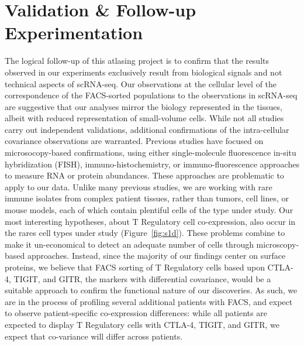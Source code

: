 \section{Validation \& Follow-up Experimentation}
The logical follow-up of this atlasing project is to confirm that the results observed in our experiments exclusively result from biological signals and not technical aspects of scRNA-seq. 
Our observations at the cellular level of the correspondence of the FACS-sorted populations to the observations in scRNA-seq are suggestive that our analyses mirror the biology represented in the tissues, albeit with reduced representation of small-volume cells. 
While not all studies carry out independent validations, additional confirmations of the intra-cellular covariance observations are warranted. %
Previous studies \citep{Shalek2013,Shalek2014} have focused on microsocopy-based confirmations, using either single-molecule fluorescence in-situ hybridization (FISH), immuno-histochemistry, or immuno-fluorescence approaches to measure RNA or protein abundances. 
These approaches are problematic to apply to our data. 
Unlike many previous studies, we are working with rare immune isolates from complex patient tissues, rather than tumors, cell lines, or mouse models, each of which contain plentiful cells of the type under study.
Our most interesting hypotheses, about T Regulatory cell co-expression, also occur in the rares cell types under study (Figure~\ref{fig:s1d}). These problems combine to make it un-economical to detect an adequate number of cells through microscopy-based approaches. 
Instead, since the majority of our findings center on surface proteins, we believe that FACS sorting of T Regulatory cells based upon CTLA-4, TIGIT, and GITR, the markers with differential covariance, would be a suitable approach to confirm the functional nature of our discoveries. 
As such, we are in the process of profiling several additional patients with FACS, and expect to observe patient-specific co-expression differences: while all patients are expected to display T Regulatory cells with CTLA-4, TIGIT, and GITR, we expect that co-variance will differ across patients.  

